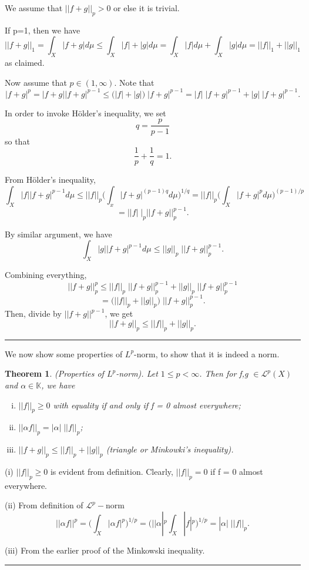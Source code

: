 \documentclass[twoside]{article}
\newcounter{lecnum}
\newtheorem{theorem}{Theorem}[lecnum]
\newenvironment{proof}{{\bf Proof:}}{\hfill\rule{2mm}{2mm}}
\begin{document}
\begin{proof} We assume that $||f+g||_p > 0$ or else it is trivial.

If p=1, then we have
$$
||f+g||_1 = \int_X|f+g|d\mu \leq \int_X|f| + |g| d\mu = \int_X|f|d\mu + \int_X|g|d\mu = ||f||_1 + ||g||_1
$$
as claimed. 

Now assume that $p \in (1,\infty)$. Note that
$$
|f+g|^p = |f+g||f+g|^{p-1} \leq \big(|f| + |g|\big)\;|f+g|^{p-1} = |f|\;|f + g|^{p-1} + |g|\;|f+g|^{p-1}.
$$

In order to invoke Hölder's inequality, we set
$$
q = \frac{p}{p-1}
$$
so that 
$$
\frac{1}{p} + \frac{1}{q} = 1.
$$

From Hölder's inequality,
$$
\int_X|f||f+g|^{p-1}d\mu \leq ||f||_p\big(\int_x|f+g|^{(p-1)q}d\mu\big)^{1/q} = ||f||_p\big(\int_X|f+g|^pd\mu\big)^{(p-1)/p}
$$
$$
= ||f|\;|_p||f + g||_p^{p-1}.
$$

By similar argument, we have
$$\int_X|g||f+g|^{p-1}d\mu \leq ||g||_p\;||f+g||_p^{p-1}.$$

Combining everything,
$$
||f+g||_p^p \leq ||f||_p\;||f + g||_p^{p-1} + ||g||_p\;||f + g||_p^{p-1}
$$
$$
= \big(||f||_p + ||g||_p\big)\;||f + g||_p^{p-1}.
$$
Then, divide by $||f+g||^{p-1}$, we get
$$
||f+g||_p \leq ||f||_p + ||g||_p.
$$

\end{proof}

We now show some properties of $L^p$-norm, to show that it is indeed a norm.

\begin{theorem}(Properties of $L^p$-norm). Let $1 \leq p < \infty$. Then for f,g $\in \mathcal{L}^p(X)$ and $\alpha \in \mathbb{K}$, we have 
\begin{enumerate}[(i)]
  \item $||f||_p \geq 0$ with equality if and only if f = 0 almost everywhere;
  \item $||\alpha f||_p = |\alpha|\; ||f||_p$;
  \item $||f + g||_p \leq ||f||_p + ||g||_p$ (triangle or Minkowki's inequality).
\end{enumerate}
\end{theorem}

\begin{proof}(i) $||f||_p \geq 0$ is evident from definition. Clearly, $||f||_p = 0$ if f = 0 almost everywhere. 

(ii) From definition of $\mathcal{L}^p-$norm
$$
||\alpha f||^p = \big(\int_X|\alpha f|^p\big)^{1/p} = \big(||\alpha|^p\int_X|f|^p\big)^{1/p} = |\alpha|\;||f||_p.
$$

(iii) From the earlier proof of the Minkowski inequality.
\end{proof}
\end{document}
